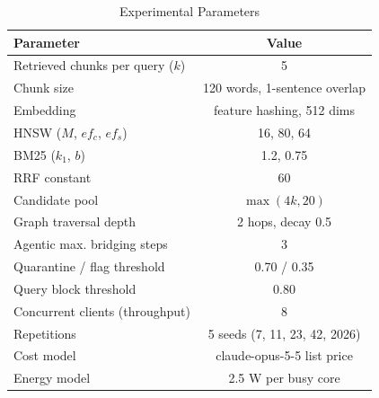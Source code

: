 \begin{table}[!t]
\caption{Experimental Parameters}
\label{tab:parameters}
\centering
\begin{tabular}{lc}
\toprule
Parameter & Value \\
\midrule
Retrieved chunks per query ($k$) & 5 \\
Chunk size & 120 words, 1-sentence overlap \\
Embedding & feature hashing, 512 dims \\
HNSW ($M$, $ef_{c}$, $ef_{s}$) & 16, 80, 64 \\
BM25 ($k_1$, $b$) & 1.2, 0.75 \\
RRF constant & 60 \\
Candidate pool & $\max(4k, 20)$ \\
Graph traversal depth & 2 hops, decay 0.5 \\
Agentic max. bridging steps & 3 \\
Quarantine / flag threshold & 0.70 / 0.35 \\
Query block threshold & 0.80 \\
Concurrent clients (throughput) & 8 \\
Repetitions & 5 seeds (7, 11, 23, 42, 2026) \\
Cost model & claude-opus-5-5 list price \\
Energy model & 2.5 W per busy core \\
\bottomrule
\end{tabular}
\end{table}
